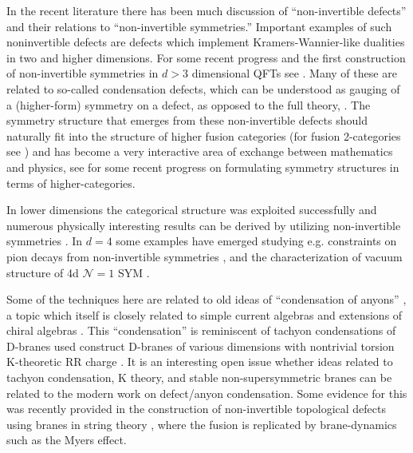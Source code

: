 \documentclass[12pt]{article}
\begin{document}
In the recent literature there has been much discussion of ``non-invertible defects'' and their relations to ``non-invertible symmetries.'' Important examples of such noninvertible defects are defects which implement  Kramers-Wannier-like dualities in two and higher dimensions.   For some recent progress and the first construction of non-invertible symmetries in $d>3$ dimensional QFTs see 
\cite{Kaidi:2021xfk, Choi:2021kmx, Bhardwaj:2022yxj}. Many of these are related to so-called condensation defects, which can be understood as gauging of a (higher-form) symmetry on a defect, as opposed to the full theory, 
\cite{Gaiotto:2019xmp, Roumpedakis:2022aik, Choi:2022zal, Bhardwaj:2022lsg, Bartsch:2022mpm, Lin:2022xod}. The symmetry structure that emerges from these non-invertible defects should naturally fit into the structure of higher fusion categories (for fusion 2-categories see \cite{douglas2018fusion}) and has become a very interactive area of exchange between mathematics and physics, see \cite{Bhardwaj:2022yxj, Bhardwaj:2022lsg, Bartsch:2022mpm, Freed:2022qnc} for some recent progress on formulating symmetry  structures in terms of higher-categories. 

In lower dimensions the categorical structure was exploited successfully and numerous physically interesting results can be derived by utilizing non-invertible symmetries 
\cite{Fuchs:2002cm, Bachas:2004sy, Fuchs:2007tx,Kapustin:2010if, Fuchs:2012dt,Gaiotto:2015aoa, Bhardwaj:2017xup,Chang:2018iay, Thorngren:2019iar, Komargodski:2020mxz,Lin:2022dhv}. In $d=4$ some examples have emerged studying e.g. constraints on pion decays from non-invertible symmetries \cite{Choi:2022jqy, Cordova:2022ieu}, and the characterization of vacuum structure of 4d $\mathcal{N}=1$ SYM \cite{Apruzzi:2022rei}. 

 



Some of the techniques here are related to old ideas of ``condensation of anyons''  \cite{Aasen:2017ubm,Bais:2002ye,Bais:2006bq,Bais:2008ni}, 
a topic which itself is closely related 
to simple current algebras 
\cite{Gato-Rivera:1990lxi} 
and extensions of chiral algebras \cite{Moore:1988ss}. 
This ``condensation''  is reminiscent of tachyon condensations of D-branes used construct D-branes of various dimensions
with nontrivial torsion K-theoretic RR charge \cite{Gopakumar:2000zd,Harvey:2000jt,Harvey:2000te,
Horava:1998jy,Kraus:2000nj,
Martinec:2002wg,Sen:1998sm,Witten:1998cd, Schafer-Nameki:2004ewn}. 
It is an interesting open issue whether ideas 
related to tachyon condensation, K theory, and stable non-supersymmetric branes can be related to the modern work on defect/anyon condensation. Some evidence for this was recently provided in the construction of non-invertible topological defects using branes in string theory \cite{Apruzzi:2022rei}, where the fusion is replicated by brane-dynamics such as the Myers effect. 
\end{document}
